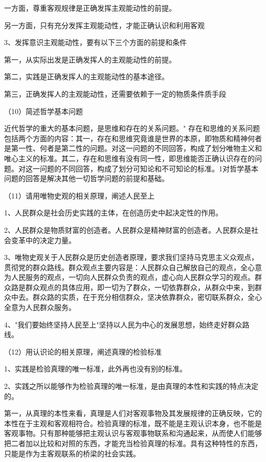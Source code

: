 \documentclass[lang=cn,10pt]{elegantbook}
\begin{document}
	一方面，尊重客观规律是正确发挥主观能动性的前提。
	
	另一方面，只有充分发挥主观能动性，才能正确认识和利用客观
	
	3、发挥意识主观能动性，要有以下三个方面的前提和条件
	
	第一，从实际出发是正确发挥人的主观能动性的前提。
	
	第二，实践是正确发挥人的主观能动性的基本途径。
	
	第三，正确发挥人的主观能动性，还需要依赖于一定的物质条件质手段
	
	（10）简述哲学基本问题
	
	近代哲学的重大的基本问题，是思维和存在的关系问题。"
	存在和思维的关系问题包括两个方面的内容：其一，存在和思维究竟谁是世界的本原，即物质和精神何者是第一性、何者是第二性的问题。对这一问题的不同回答，构成了划分唯物主义和唯心主义的标准。其二，存在和思维有没有同一性，即思维能否正确认识存在的问题。对这一问题的不同回答，构成了划分可知论和不可知论的标准。1对哲学基本问题的回答是解决其他一切哲学问题的前提和基础。
	
	（11）请用唯物史观的相关原理，阐述人民至上
	
	1、人民群众是社会历史实践的主体，在创造历史中起决定性的作用。
	
	2、人民群众是物质财富的创造者。人民群众是精神财富的创造者。人民群众是社会变革中的决定力量。
	
	3、唯物史观关于人民群众是历史创造者原理，要求我们坚持马克思主义众观点，贯彻党的群众路线。群众观点主要内容是：人民群众自己解放自己的观点，全心意为人民服务的观点，一切向人民群众负责的观点，虚心向人民群众学习的观点。群众路是群众观点的具体应用，即一切为了群众，一切依靠群众，从群众中来，到群众中去。群众路的实质，在于充分相信群众，坚决依靠群众，密切联系群众，全心全意为人民群众服务。
	
	4、"我们要始终坚持人民至上"坚持以人民为中心的发展思想，始终走好群众路线。
	
	（12）用认识论的相关原理，阐述真理的检验标准
	
	1、实践是检验真理的唯一标准，此外再也没有别的标准。
	
	2、实践之所以能够作为检验真理的唯一标准，是由真理的本性和实践的特点决定的。
	
	第一，从真理的本性来看，真理是人们对客观事物及其发展规律的正确反映，它的本性在于主观和客观相符合。检验真理的标准，既不能是主观认识本身，也不能是客观事物。只有那种能够把主观认识与客观事物联系和沟通起来，从而使人们能够把二者加以比较和对照的东西，才能充当检验真理的标准。具有这种特性的东西，只能是作为主客观联系的桥梁的社会实践。
	
\end{document}
